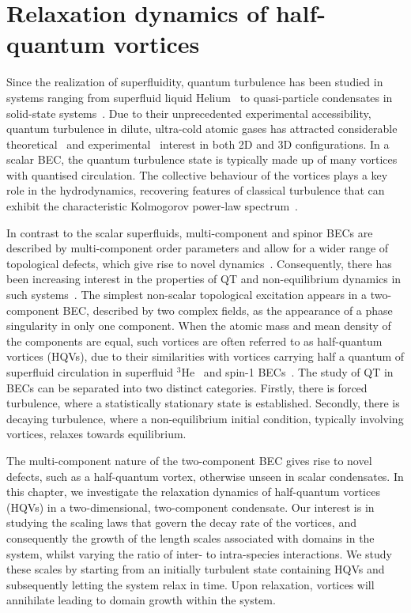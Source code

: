\chapter{Relaxation dynamics of half-quantum vortices}\label{chap: two-comp}

Since the realization of superfluidity, quantum turbulence has been studied
in systems ranging from superfluid liquid
Helium~\cite{Barenghi2014, Walmsley2014} to quasi-particle
condensates in solid-state systems~\cite{Kreil2018}.
Due to their unprecedented experimental accessibility, quantum turbulence in
dilute, ultra-cold atomic gases has attracted considerable
theoretical~\cite{Kobayashi2007,Numasato2010, Reeves2013, Billam2014,
Simula2014,Baggaley2018} and experimental~\cite{Henn2009,Kwon2014,Seo2017,
Navon2019,Gauthier2019, Johnstone2019} interest in both 2D and 3D
configurations.
In a scalar BEC, the quantum turbulence state is typically made up of many
vortices with quantised circulation.
The collective behaviour of the vortices plays a key role
in the hydrodynamics, recovering features of classical turbulence that can
exhibit the characteristic Kolmogorov power-law spectrum~\cite{Kobayashi2005}.

In contrast to the scalar superfluids, multi-component and spinor BECs are
described by multi-component order parameters and allow for a wider range of
topological defects, which give rise to novel dynamics~\cite{Kasamatsu2016,
    Weiss2019,Kobayashi2009,Kasamatsu2005}.
Consequently, there has been increasing interest in the properties of QT and
non-equilibrium dynamics in such
systems~\cite{Salman2009, Schmied2019, Karl2013, Prufer2018, Hofmann2014}.
The simplest non-scalar topological excitation appears in a two-component BEC,
described by two complex fields, as the appearance of a phase singularity in
only one component.
When the atomic mass and mean density of the components are equal, such vortices
are often referred to as half-quantum vortices (HQVs), due to their similarities
with vortices carrying half a quantum of superfluid circulation in superfluid
\(^3\)He~\cite{Autti2016} and spin-1 BECs~\cite{Leonhardt2000,Seo2015}.
The study of QT in BECs can be separated into two distinct categories.
Firstly, there is forced turbulence, where a statistically stationary state is
established.
Secondly, there is decaying turbulence, where a non-equilibrium initial
condition, typically involving vortices, relaxes towards equilibrium.

The multi-component nature of the two-component BEC gives rise to novel defects,
such as a half-quantum vortex, otherwise unseen in scalar condensates.
In this chapter, we investigate the relaxation dynamics of half-quantum vortices
(HQVs) in a two-dimensional, two-component condensate.
Our interest is in studying the scaling laws that govern the decay rate of the
vortices, and consequently the growth of the length scales associated with
domains in the system, whilst varying the ratio of inter- to intra-species
interactions.
We study these scales by starting from an initially turbulent state containing
HQVs and subsequently letting the system relax in time.
Upon relaxation, vortices will annihilate leading to domain growth within
the system.

